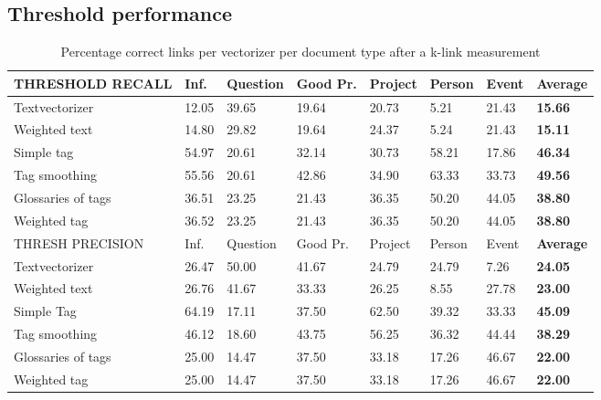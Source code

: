 \subsection{Threshold performance}
\begin{table}
\begin{tabular}{| l | l | l | l | l | l | l | l |}
\hline
THRESHOLD RECALL & Inf. &  Question &  Good Pr.& Project & Person &  Event & {\bf Average} \\
\hline
Textvectorizer & 12.05 & 39.65 & 19.64 & 20.73 & 5.21 & 21.43 & {\bf 15.66}\\
Weighted text & 14.80 & 29.82 & 19.64 & 24.37 & 5.24 & 21.43 & {\bf 15.11}\\
Simple tag & 54.97 & 20.61 & 32.14 & 30.73 & 58.21 & 17.86 & {\bf 46.34}\\
Tag smoothing & 55.56 & 20.61 & 42.86 & 34.90 & 63.33 & 33.73 & {\bf 49.56}\\
Glossaries of tags & 36.51 & 23.25 & 21.43 & 36.35 & 50.20 & 44.05 & {\bf 38.80}\\
Weighted tag & 36.52 & 23.25 & 21.43 & 36.35 & 50.20 & 44.05 & {\bf 38.80}\\
\hline

\hline
THRESH PRECISION & Inf. &  Question &  Good Pr.& Project & Person &  Event & {\bf Average} \\
\hline
Textvectorizer & 26.47 & 50.00 & 41.67 & 24.79 & 24.79 & 7.26 & {\bf 24.05}\\
Weighted text & 26.76 & 41.67 & 33.33 & 26.25 & 8.55 & 27.78 & {\bf 23.00}\\
Simple Tag & 64.19 & 17.11 & 37.50 & 62.50 & 39.32 & 33.33 & {\bf 45.09}\\
Tag smoothing & 46.12 & 18.60 & 43.75 & 56.25 & 36.32 & 44.44 & {\bf 38.29}\\
Glossaries of tags & 25.00 & 14.47 & 37.50 & 33.18 & 17.26 & 46.67 & {\bf 22.00}\\
Weighted tag & 25.00 & 14.47 & 37.50 & 33.18 & 17.26 & 46.67 & {\bf 22.00}\\
\hline
\end{tabular}

\caption{Percentage correct links per vectorizer per document type after a k-link measurement}
\label{bayes_table1}
\end{table}

